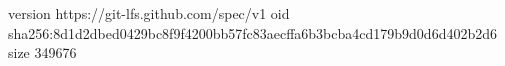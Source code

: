 version https://git-lfs.github.com/spec/v1
oid sha256:8d1d2dbed0429bc8f9f4200bb57fc83aecffa6b3bcba4cd179b9d0d6d402b2d6
size 349676

